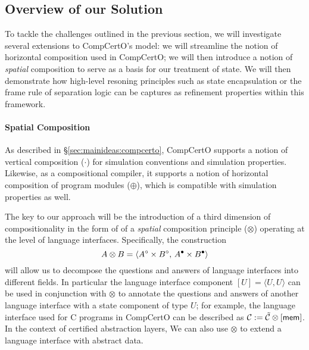
\subsection{Overview of our Solution}

To tackle the challenges outlined in the previous section,
we will investigate several extensions to CompCertO's model:
we will streamline the notion of horizontal composition used in CompCertO;
we will then introduce a notion of \emph{spatial} composition
to serve as a basis for our treatment of state.
We will then demonstrate how high-level resoning principles
such as state encapsulation or the frame rule of separation logic
can be captures as refinement properties within this framework.

\paragraph{Spatial Composition}

As described in \S\ref{sec:mainideas:compcerto},
CompCertO supports a notion of vertical composition ($\cdot$)
for simulation conventions and simulation properties.
Likewise, as a compositional compiler,
it supports a notion of horizontal composition of program modules ($\oplus$),
which is compatible with simulation properties as well.

The key to our approach will be the introduction of a third dimension of compositionality
in the form of of a \emph{spatial} composition principle ($\otimes$)
operating at the level of language interfaces.
Specifically, the construction
\[ A \otimes B = \langle A^\circ \times B^\circ, \, A^\bullet \times B^\bullet \rangle \]
will allow us to decompose
the questions and answers of language interfaces
into different fields.
In particular the language interface component $[U] = \langle U,U \rangle$
can be used in conjunction with $\otimes$
to annotate the questions and answers of another language interface
with a state component of type $U$;
for example,
the language interface used for C programs in CompCertO
can be described as $\mathcal{C} := \tilde{\mathcal{C}} \otimes [ \mathsf{mem} ]$.
In the context of certified abstraction layers,
We can also use $\otimes$ to extend a language interface with abstract data.


